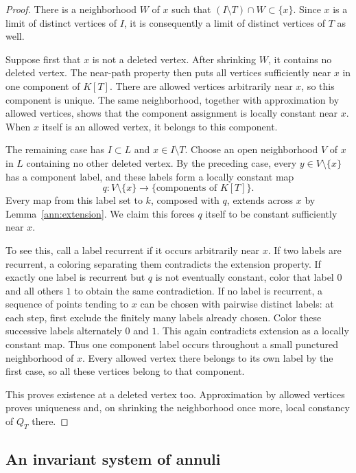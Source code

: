 \begin{proof}
There is a neighborhood $W$ of $x$ such that
$(I\setminus T)\cap W\subset\{x\}$. Since $x$ is a limit of distinct
vertices of $I$, it is consequently a limit of distinct vertices of
$T$ as well.

Suppose first that $x$ is not a deleted vertex. After shrinking $W$,
it contains no deleted vertex. The near-path property then puts all
vertices sufficiently near $x$ in one component of $K[T]$. There are
allowed vertices arbitrarily near $x$, so this component is unique.
The same neighborhood, together with approximation by allowed vertices,
shows that the component assignment is locally constant near $x$.
When $x$ itself is an allowed vertex, it belongs to this component.

The remaining case has $I\subset L$ and $x\in I\setminus T$.
Choose an open neighborhood $V$ of $x$ in $L$ containing no other
deleted vertex. By the preceding case, every $y\in V\setminus\{x\}$
has a component label, and these labels form a locally constant map
\[
  q:V\setminus\{x\}\longrightarrow\{\text{components of }K[T]\}.
\]
Every map from this label set to $k$, composed with $q$, extends across
$x$ by Lemma~\ref{ann:extension}. We claim this forces $q$ itself to
be constant sufficiently near $x$.

To see this, call a label recurrent if it occurs arbitrarily near $x$.
If two labels are recurrent, a coloring separating them contradicts
the extension property. If exactly one label is recurrent but $q$ is
not eventually constant, color that label $0$ and all others $1$ to
obtain the same contradiction. If no label is recurrent, a sequence
of points tending to $x$ can be chosen with pairwise distinct labels:
at each step, first exclude the finitely many labels already chosen.
Color these successive labels alternately $0$ and $1$.
This again contradicts extension as a locally constant map.
Thus one component label occurs throughout a small punctured
neighborhood of $x$. Every allowed vertex there belongs to its own
label by the first case, so all these vertices belong to that component.

This proves existence at a deleted vertex too. Approximation by allowed
vertices proves uniqueness and, on shrinking the neighborhood once
more, local constancy of $Q_T$ there.
\end{proof}

\subsection{An invariant system of annuli}

